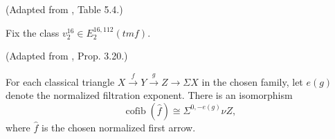 \begin{definition}
\label{frontier:Literature:19f82a11f795}
(Adapted from \cite{BR21}, Table 5.4.)\par{}

Fix the class $v_2^{16}\in E_2^{16,112}(\mathit{tmf})$.
\end{definition}

\begin{definition}
\label{frontier:Literature:1aa6a10db546}
(Adapted from \cite{LWX126}, Prop. 3.20.)\par{}

For each classical triangle $X\xrightarrow{f}Y\xrightarrow{g}Z\to\Sigma X$ in the chosen family, let $e(g)$ denote the normalized filtration exponent. There is an isomorphism\[\operatorname{cofib}(\widehat f)\cong\Sigma^{0,-e(g)}\nu Z,\]where $\widehat f$ is the chosen normalized first arrow.
\end{definition}

